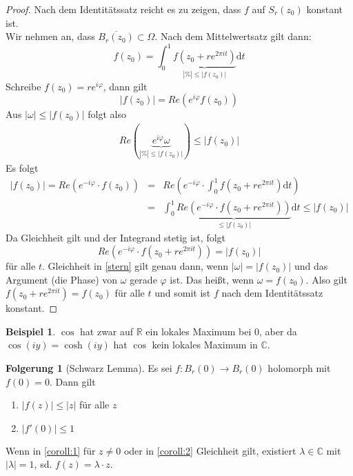 \documentclass[11pt,titlepage]{article}
\theoremstyle{definition}
\newtheorem{corollary}[theorem]{Folgerung}
\newtheorem{example}[theorem]{Beispiel}
\theoremstyle{remark}
\begin{document}
	\begin{proof}
		Nach dem Identitätssatz reicht es zu zeigen, dass $f$ auf $S_r (z_0)$ konstant ist. \\
		Wir nehmen an, dass $\overline{B_r (z_0)}\subset\Omega$. Nach dem Mittelwertsatz gilt dann:
		\[ f(z_0)=\int_0^1 \underbrace{f(z_0 +re^{2\pi it})}_{|\%|\leq |f(z_0)|}\mathrm{d}t \]
		Schreibe $f(z_0)=re^{i\varphi}$, dann gilt 
		\[ |f(z_0)|= Re(e^{i\varphi}f(z_0)) \]
		Aus $|\omega|\leq|f(z_0)|$ folgt also 
		\begin{eqnarray}
			Re(\underbrace{e^{i\varphi}\omega}_{|\%|\leq |f(z_0)|})\leq |f(z_0)| \label{stern}
		\end{eqnarray}
		Es folgt 
		\begin{eqnarray*}
			|f(z_0)|=Re(e^{-i\varphi}\cdot f(z_0)) &=& 
			Re\left(e^{-i\varphi}\cdot \int_0^1 f(z_0 +re^{2\pi it})\mathrm{d}t\right) \\
			&=& \int_0^1 \underbrace{Re(e^{-i\varphi}\cdot f(z_0 +re^{2\pi it}))}_{\leq |f(z_0)|}
			\mathrm{d}t \leq |f(z_0)|
		\end{eqnarray*}
		Da Gleichheit gilt und der Integrand stetig ist, folgt
		\[ Re\left( e^{-i\varphi} \cdot f(z_0 +re^{2\pi it})\right) =|f(z_0)| \]
		für alle $t$. Gleichheit in \ref{stern} gilt genau dann, wenn $|\omega|=|f(z_0)|$ und das 
		Argument (die Phase) von $\omega$ gerade $\varphi$ ist. Das heißt, wenn $\omega =f(z_0)$. 
		Also gilt $f(z_0 +re^{2\pi it})=f(z_0)$ für alle $t$ und somit ist $f$ nach dem Identitätssatz 
		konstant.
	\end{proof}
	
	\begin{example}
		$\cos$ hat zwar auf $\mathbb{R}$ ein lokales Maximum bei $0$, aber da 
		$\cos (iy)=\cosh(iy)$ hat $\cos$ kein lokales Maximum in $\mathbb{C}$.
	\end{example}
	
	\begin{corollary}[Schwarz Lemma] \label{coroll:SL}
		Es sei $f:B_r (0)\to B_r(0)$ holomorph mit $f(0)=0$. Dann gilt
		\begin{enumerate}
			\item $|f(z)|\leq |z|$ für alle $z$ \label{coroll:1}
			\item $|f'(0)|\leq 1$ \label{coroll:2}
		\end{enumerate}
		Wenn in \ref{coroll:1} für $z\neq 0$ oder in \ref{coroll:2} Gleichheit gilt, existiert $\lambda\in
		\mathbb{C}$ mit $|\lambda|=1$, sd. $f(z)=\lambda\cdot z$.
	\end{corollary}
	
\end{document}

